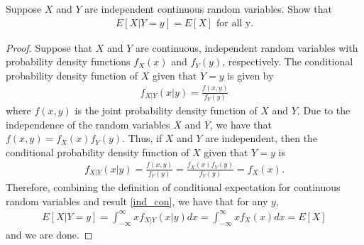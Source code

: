 \begin{problem}{3.10}
  Suppose $X$ and $Y$ are independent continuous random variables. Show that
  \begin{align*}
    E[X|Y=y] = E[X] \text{ for all y.}
  \end{align*}
\end{problem}

\begin{proof}
  Suppose that $X$ and $Y$ are continuous, independent random variables with probability
  density functions $f_X(x)$ and $f_Y(y)$, respectively. The conditional probability density
  function of $X$ given that $Y=y$ is given by
  \begin{align*}
    f_{X|Y}(x|y) = \frac{f(x, y)}{f_Y(y)}
  \end{align*}
  where $f(x, y)$ is the joint probability density function of $X$ and $Y$. Due to the independence
  of the random variables $X$ and $Y$, we have that $f(x, y) = f_X(x)f_Y(y)$. Thus, if $X$ and $Y$ are independent, then
  the conditional probability density function of $X$ given that $Y=y$ is
  \begin{align}\label{ind_con}
    f_{X|Y}(x|y) = \frac{f(x, y)}{f_Y(y)} = \frac{f_X(x)f_Y(y)}{f_Y(y)} = f_X(x).
  \end{align}
  Therefore, combining the definition of conditional expectation for continuous random variables
  and result \eqref{ind_con}, we have that for any $y$,
  \begin{align*}
    E[X|Y=y] = \int_{-\infty}^\infty x f_{X|Y}(x|y) dx = \int_{-\infty}^\infty x f_X(x) dx = E[X]
  \end{align*}
  and we are done.\end{proof}
\newpage
